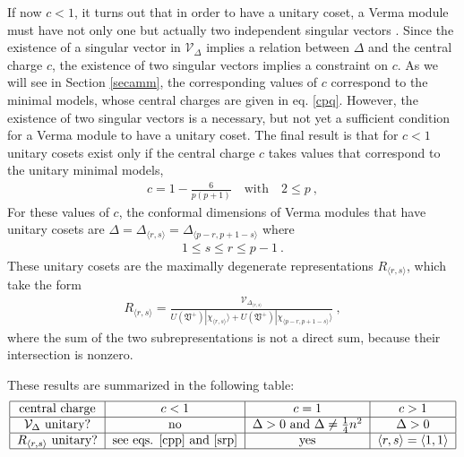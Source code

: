 \documentclass[12pt, a4paper, notitlepage, twoside]{report}
\numberwithin{equation}{section}
\theoremstyle{break}
\begin{document}
If now $c<1$, it turns out that in order to have a unitary coset, a Verma module must have not only one but actually two independent singular vectors \cite{fms97}. 
Since the existence of a singular vector in $\mathcal{V}_\Delta$ implies a relation between $\Delta$ and the central charge $c$, the existence of two singular vectors implies a constraint on $c$. 
As we will see in Section \ref{secamm}, the corresponding values of $c$ correspond to the minimal models, whose central charges are given in eq. \eqref{cpq}. 
However, the existence of two singular vectors is a necessary, but not yet a sufficient condition for a Verma module to have a unitary coset.
The final result is that for $c<1$ unitary cosets exist only if the central charge $c$ takes values that correspond to the unitary minimal models,
\begin{align}
 c = 1-\frac{6}{p(p+1)}  \quad \text{with} \quad 2\leq p\ ,
\label{cpp}
\end{align}
For these values of $c$,
the conformal dimensions of Verma modules that have unitary cosets are $\Delta=\Delta_{\langle r,s \rangle}=\Delta_{\langle p-r, p+1-s \rangle}$ where
\begin{align}
   1\leq s\leq r\leq p-1 \ .
\label{srp}
\end{align}
These unitary cosets are the maximally degenerate representations $R_{\langle r,s \rangle}$, which take the form
\begin{align}
 R_{\langle r,s \rangle} = \frac{\mathcal{V}_{\Delta_{\langle r,s \rangle}}}{U(\mathfrak{V}^+)|\chi_{\langle r,s \rangle}\rangle + U(\mathfrak{V}^+)|\chi_{\langle p-r,p+1-s \rangle}\rangle}\ ,
\label{rrs}
\end{align}
where the sum of the two subrepresentations is not a direct sum, because their intersection is nonzero. 

These results are summarized in the following table:
\begin{align}
 \begin{tabular}{|c|c|c|c|}
  \hline
central charge & $c<1$ & $c=1$ & $c>1$
\\
\hline
$\mathcal{V}_\Delta$ unitary? & no & $\Delta>0$ and $\Delta \neq \frac14 n^2$ & $\Delta>0$
\\
\hline
$R_{\langle r,s\rangle}$ unitary? & see eqs. \eqref{cpp} and \eqref{srp} &  yes & $\langle r,s \rangle = \langle 1,1\rangle$
\\
\hline
 \end{tabular}
\end{align}
\end{document}
